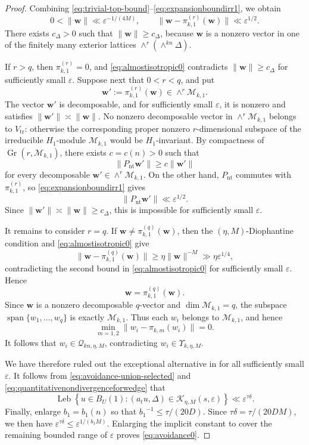 \documentclass[reqno,11pt]{amsart}
\numberwithin{equation}{section}
\theoremstyle{definition}
\theoremstyle{remark}
\begin{document}
\begin{proof}
Combining
\eqref{eq:trivial-top-bound}--\eqref{eq:expansionboundirr1}, we obtain
\begin{equation}\label{eq:almostisotropic0}
0<\|\mathbf w\|\ll\varepsilon^{-1/(4M)},
\qquad
\|\mathbf w-\pi_{k,1}^{(r)}(\mathbf w)\|
\ll\varepsilon^{1/2}.
\end{equation}
There exists $c_\Delta>0$ such that
$\|\mathbf w\|\ge c_\Delta$, because $\mathbf w$ is a nonzero vector
in one of the finitely many exterior lattices
$\wedge^r(\wedge^{kn}\Delta)$.

If $r>q$, then $\pi_{k,1}^{(r)}=0$, and
\eqref{eq:almostisotropic0} contradicts
$\|\mathbf w\|\ge c_\Delta$ for sufficiently small $\varepsilon$. Suppose next that $0<r<q$, and put
$$
\mathbf w'
:=
\pi_{k,1}^{(r)}(\mathbf w)
\in\wedge^r\mathcal M_{k,1}.
$$
The vector $\mathbf w'$ is decomposable, and for sufficiently small
$\varepsilon$, it is nonzero and satisfies
$\|\mathbf w'\|\asymp\|\mathbf w\|$. No nonzero decomposable vector
in $\wedge^r\mathcal M_{k,1}$ belongs to $V_{\mathrm{tr}}$:
otherwise the corresponding proper nonzero $r$-dimensional subspace
of the irreducible $H_1$-module $\mathcal M_{k,1}$ would be
$H_1$-invariant. By compactness of
$\operatorname{Gr}(r,\mathcal M_{k,1})$, there exists $c=c(n)>0$
such that
$$
\|P_{\mathrm{nt}}\mathbf w'\|
\ge c\|\mathbf w'\|
$$
for every decomposable
$\mathbf w'\in\wedge^r\mathcal M_{k,1}$. On the other hand,
$P_{\mathrm{nt}}$ commutes with $\pi_{k,1}^{(r)}$, so
\eqref{eq:expansionboundirr1} gives
$$
\|P_{\mathrm{nt}}\mathbf w'\|
\ll\varepsilon^{1/2}.
$$
Since $\|\mathbf w'\|\asymp\|\mathbf w\|\ge c_\Delta$, this is
impossible for sufficiently small $\varepsilon$.

It remains to consider $r=q$. If
$\mathbf w\ne\pi_{k,1}^{(q)}(\mathbf w)$, then the
$(\eta,M)$-Diophantine condition and
\eqref{eq:almostisotropic0} give
$$
\|\mathbf w-\pi_{k,1}^{(q)}(\mathbf w)\|
\ge
\eta\|\mathbf w\|^{-M}
\gg
\eta\varepsilon^{1/4},
$$
contradicting the second bound in
\eqref{eq:almostisotropic0} for sufficiently small $\varepsilon$.
Hence
$$
\mathbf w=\pi_{k,1}^{(q)}(\mathbf w).
$$
Since $\mathbf w$ is a nonzero decomposable $q$-vector and
$\dim\mathcal M_{k,1}=q$, the subspace
$\operatorname{span}\{w_1,\ldots,w_q\}$ is exactly
$\mathcal M_{k,1}$. Thus each $w_i$ belongs to
$\mathcal M_{k,1}$, and hence
$$
\min_{m=1,2}\|w_i-\pi_{k,m}(w_i)\|=0.
$$
It follows that $w_i\in\mathscr Q_{kn,\eta,M}$, contradicting
$w_i\in\Upsilon_{k,\eta,M}$.

We have therefore ruled out the exceptional alternative in
 for all sufficiently small $\varepsilon$.
It follows from
\eqref{eq:avoidance-union-selected} and
\eqref{eq:quantitativenondivergenceforwedge} that
$$
\operatorname{Leb}
\left\{u\in B_U(1):
(a_tu,\Delta)\in\mathcal K_{\eta,M}(s,\varepsilon)
\right\}
\ll
\varepsilon^{\tau\delta}.
$$
Finally, enlarge $b_1=b_1(n)$ so that
${b_1}^{-1}\le {\tau}/({20D})$.
Since $\tau\delta=\tau/(20DM)$, we then have
$\varepsilon^{\tau\delta}\le
\varepsilon^{1/(b_1M)}$. Enlarging the implicit constant to cover the
remaining bounded range of $\varepsilon$ proves
\eqref{eq:avoidance0}.
\end{proof}
\end{document}

